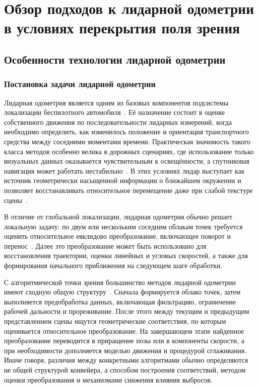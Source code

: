 \section{Обзор подходов к лидарной одометрии в условиях перекрытия поля зрения}
\subsection{Особенности технологии лидарной одометрии}
\label{sec:1-1-overview-lidar-odometry}

\subsubsection{Постановка задачи лидарной одометрии}

Лидарная одометрия является одним из базовых компонентов подсистемы локализации беспилотного автомобиля~\cite{lidar-odometry-urban-canyons-huang,dlo-chen}. Её назначение состоит в оценке собственного движения по последовательности лидарных измерений, когда необходимо определить, как изменилось положение и ориентация транспортного средства между соседними моментами времени. Практическая значимость такого класса методов особенно велика в дорожных сценариях, где использование только визуальных данных оказывается чувствительным к освещённости, а спутниковая навигация может работать нестабильно~\cite{visual-odometry-rain-tan,lidar-odometry-urban-canyons-huang}. В этих условиях лидар выступает как источник геометрически насыщенной информации о ближайшем окружении и позволяет восстанавливать относительное перемещение даже при слабой текстуре сцены~\cite{dlo-chen}.

В отличие от глобальной локализации, лидарная одометрия обычно решает локальную задачу: по двум или нескольким соседним облакам точек требуется оценить относительное евклидово преобразование, включающее поворот и перенос~\cite{delio-thomas,dlo-chen}. Далее это преобразование может быть использовано для восстановления траектории, оценки линейных и угловых скоростей, а также для формирования начального приближения на следующем шаге обработки.

С алгоритмической точки зрения большинство методов лидарной одометрии имеют сходную общую структуру~\cite{dlo-chen}. Сначала формируется облако точек, затем выполняется предобработка данных, включающая фильтрацию, ограничение рабочей дальности и прореживание. После этого между текущим и предыдущим представлением сцены ищутся геометрические соответствия, по которым оценивается относительное преобразование. На завершающем этапе найденное преобразование переводится в приращение позы или в компоненты скорости, а при необходимости дополняется моделью движения и процедурой сглаживания. Иначе говоря, различия между конкретными алгоритмами обычно определяются не общей структурой конвейера, а способом построения соответствий, методом оценки преобразования и механизмами снижения влияния выбросов.

